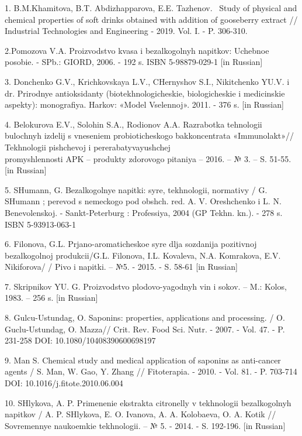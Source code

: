   \begin{noparindent}

1. B.M.Khamitova, B.T. Abdizhapparova, E.E. Tazhenov.~ Study of physical
and chemical properties of soft drinks obtained with addition of
gooseberry extract // Industrial Technologies and Engineering - 2019.
Vol. I. - P. 306-310.

2.Pomozova V.A. Proizvodstvo kvasa i bezalkogol\textquotesingle nyh
napitkov: Uchebnoe posobie. - SPb.: GIORD, 2006. - 192 s. ISBN
5-98879-029-1 {[}in Russian{]}

3. Donchenko G.V., Krichkovskaya L.V., CHernyshov S.I., Nikitchenko
YU.V. i dr. Prirodnye antioksidanty (biotekhnologicheskie,
biologicheskie i medicinskie aspekty): monografiya.
Har\textquotesingle kov: «Model\textquotesingle{} Vselennoj». 2011. -
376 s. {[}in Russian{]}

4. Belokurova E.V., Solohin S.A., Rodionov A.A. Razrabotka tehnologii
bulochnyh izdelij s vneseniem probioticheskogo bakkoncentrata
«Immunolakt»// Tekhnologii pishchevoj i pererabatyvayushchej
\\promyshlennosti APK -- produkty zdorovogo pitaniya -- 2016. -- № 3. --
S. 51-55. {[}in Russian{]}

5. SHumann, G. Bezalkogol\textquotesingle nye napitki:
syr\textquotesingle e, tekhnologii, normativy / G. SHumann ; perevod s
nemeckogo pod obshch. red. A. V. Oreshchenko i L. N. Benevolenskoj. -
Sankt-Peterburg : Professiya, 2004 (GP Tekhn. kn.). - 278 s. ISBN
5-93913-063-1

6. Filonova, G.L. Prjano-aromaticheskoe
syr\textquotesingle\textquotesingle e dlja sozdanija pozitivnoj
bezalkogol\textquotesingle\textquotesingle noj produkcii/G.L. Filonova,
I.L. Kovaleva, N.A. Komrakova, E.V. Nikiforova/ / Pivo i napitki. -- №5.
- 2015. - S. 58-61 {[}in Russian{]}

7. Skripnikov YU. G. Proizvodstvo plodovo-yagodnyh vin i sokov. -- M.:
Kolos, 1983. -- 256 s. {[}in Russian{]}

8. Gulcu-Ustundag, O. Saponins: properties, applications and processing.
/ O. Guclu-Ustundag, O. Mazza// Crit. Rev. Food Sci. Nutr. - 2007. -
Vol. 47. - P. 231-258 DOI: 10.1080/10408390600698197

9. Man S. Chemical study and medical application of saponins as
anti-cancer agents / S. Man, W. Gao, Y. Zhang // Fitoterapia. - 2010. -
Vol. 81. - P. 703-714 DOI: 10.1016/j.fitote.2010.06.004

10. SHlykova, A. P. Primenenie ekstrakta citronelly v tekhnologii
bezalkogol\textquotesingle nyh napitkov / A. P. SHlykova, E. O. Ivanova,
A. A. Kolobaeva, O. A. Kotik // Sovremennye naukoemkie tekhnologii. -- №
5. - 2014. - S. 192-196. {[}in Russian{]}


\end{noparindent}
